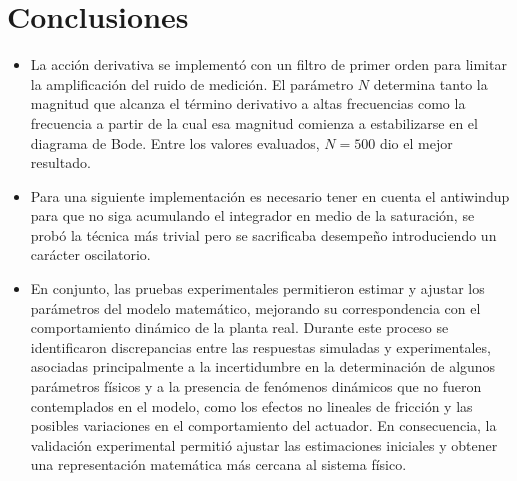 \section{Conclusiones}

\begin{itemize}
    \item La acción derivativa se implementó con un filtro de primer orden para limitar la amplificación del ruido de medición. El parámetro \(N\) determina tanto la magnitud que alcanza el término derivativo a altas frecuencias como la frecuencia a partir de la cual esa magnitud comienza a estabilizarse en el diagrama de Bode. Entre los valores evaluados, \(N = 500\) dio el mejor resultado. 

    \item Para una siguiente implementación es necesario tener en cuenta el antiwindup para que no siga acumulando el integrador en medio de la saturación, se probó la técnica más trivial pero se sacrificaba desempeño introduciendo un carácter oscilatorio.
    
    \item En conjunto, las pruebas experimentales permitieron estimar y ajustar los parámetros del modelo matemático, mejorando su correspondencia con el comportamiento dinámico de la planta real. Durante este proceso se identificaron discrepancias entre las respuestas simuladas y experimentales, asociadas principalmente a la incertidumbre en la determinación de algunos parámetros físicos y a la presencia de fenómenos dinámicos que no fueron contemplados en el modelo, como los efectos no lineales de fricción y las posibles variaciones en el comportamiento del actuador. En consecuencia, la validación experimental permitió ajustar las estimaciones iniciales y obtener una representación matemática más cercana al sistema físico. 
\end{itemize}